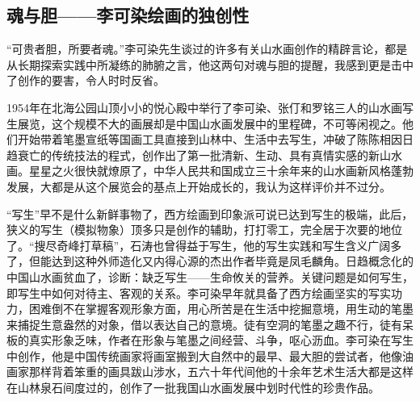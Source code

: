 \documentclass{article}
\begin{document}
\subsection{魂与胆——李可染绘画的独创性}
“可贵者胆，所要者魂。”李可染先生谈过的许多有关山水画创作的精辟言论，都是从长期探索实践中所凝练的肺腑之言，他这两句对魂与胆的提醒，我感到更是击中了创作的要害，令人时时反省。

1954年在北海公园山顶小小的悦心殿中举行了李可染、张仃和罗铭三人的山水画写生展览，这个规模不大的画展却是中国山水画发展中的里程碑，不可等闲视之。他们开始带着笔墨宣纸等国画工具直接到山林中、生活中去写生，冲破了陈陈相因日趋衰亡的传统技法的程式，创作出了第一批清新、生动、具有真情实感的新山水画。星星之火很快就燎原了，中华人民共和国成立三十余年来的山水画新风格蓬勃发展，大都是从这个展览会的基点上开始成长的，我认为这样评价并不过分。

“写生”早不是什么新鲜事物了，西方绘画到印象派可说已达到写生的极端，此后，狭义的写生（模拟物象）顶多只是创作的辅助，打打零工，完全居于次要的地位了。“搜尽奇峰打草稿”，石涛也曾得益于写生，他的写生实践和写生含义广阔多了，但能达到这种外师造化又内得心源的杰出作者毕竟是凤毛麟角。日趋概念化的中国山水画贫血了，诊断：缺乏写生——生命攸关的营养。关键问题是如何写生，即写生中如何对待主、客观的关系。李可染早年就具备了西方绘画坚实的写实功力，困难倒不在掌握客观形象方面，用心所苦是在生活中挖掘意境，用生动的笔墨来捕捉生意盎然的对象，借以表达自己的意境。徒有空洞的笔墨之趣不行，徒有呆板的真实形象乏味，作者在形象与笔墨之间经营、斗争，呕心沥血。李可染在写生中创作，他是中国传统画家将画室搬到大自然中的最早、最大胆的尝试者，他像油画家那样背着笨重的画具跋山涉水，五六十年代间他的十余年艺术生活大都是这样在山林泉石间度过的，创作了一批我国山水画发展中划时代性的珍贵作品。
\end{document}

